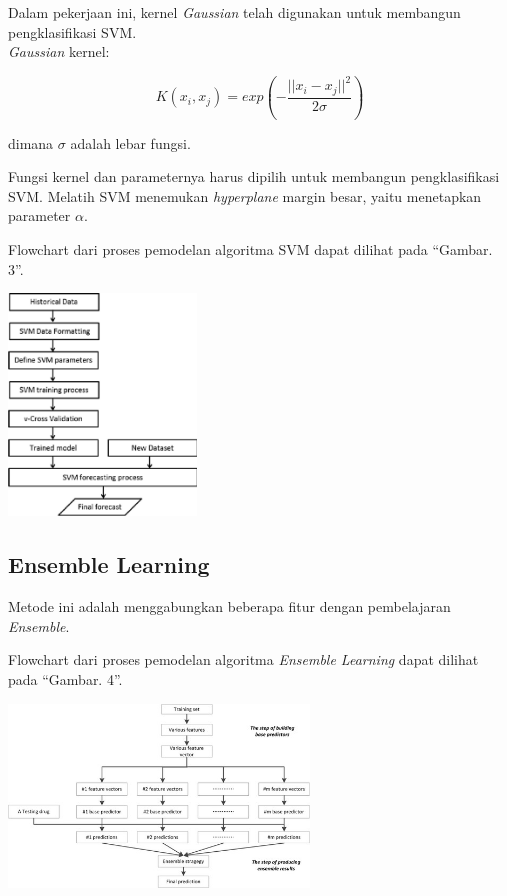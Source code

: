 \documentclass[conference]{IEEEtran}
\begin{document}
Dalam pekerjaan ini, kernel \emph{Gaussian} telah digunakan
untuk membangun pengklasifikasi SVM.\\ \emph{Gaussian} kernel:

\begin{equation}
K(x_i,x_j) = exp\left (- \frac{||x_i-x_j||^2}{2\sigma} \right )
\label{eq5}
\end{equation}

\noindent dimana $\sigma$ adalah lebar fungsi.

Fungsi kernel dan parameternya harus dipilih untuk membangun pengklasifikasi SVM. Melatih SVM menemukan \emph{hyperplane} margin besar, yaitu menetapkan parameter $\alpha$.

Flowchart dari proses pemodelan algoritma SVM dapat dilihat pada ``Gambar. 3''\cite{inproceedings}.\vspace{6pt}

\begin{minipage}{\linewidth}
\centerline{\includegraphics[width=50mm]{Gambar/Gbr003.jpg}}
\label{fig3}
\end{minipage}

\subsection{Ensemble Learning}

Metode ini adalah menggabungkan beberapa fitur dengan pembelajaran \emph{Ensemble}.

Flowchart dari proses pemodelan algoritma \emph{Ensemble Learning} dapat dilihat pada ``Gambar. 4''\cite{zhang}.\vspace{6pt}

\begin{minipage}{\linewidth}
\centerline{\includegraphics[width=80mm]{Gambar/Gbr004.png}}
\label{fig4}
\end{minipage}
\end{document}
